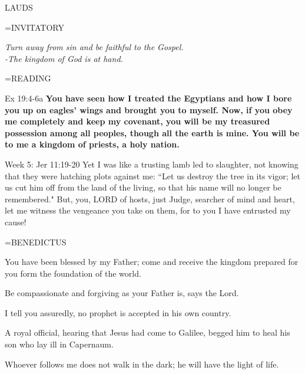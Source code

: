 \begin{flushleft}\normalsize LAUDS\\\end{flushleft}
\hangindent=\parindent \small{INVITATORY}
\begin{center}
\textit{Turn away from sin and be faithful to the Gospel.\\}
\textit{-The kingdom of God is at hand.\\}
\end{center}

\hangindent=\parindent \small READING
\begin{description}[labelindent=\parindent, leftmargin=*]
\item [Week 1-4:]   Ex 19:4-6a \textbf{  You have seen how I treated the Egyptians and how I bore you up on eagles’ wings and brought you to myself. Now, if you obey me completely and keep my covenant, you will be my treasured possession among all peoples, though all the earth is mine. You will be to me a kingdom of priests, a holy nation.}
\end{description}

Week 5:  Jer 11:19-20  Yet I was like a trusting lamb led to slaughter, not knowing that they were hatching plots against me: “Let us destroy the tree in its vigor; let us cut him off from the land of the living, so that his name will no longer be remembered." But, you, LORD of hosts, just Judge, searcher of mind and heart, let me witness the vengeance you take on them, for to you I have entrusted my cause!

\hangindent=\parindent \small BENEDICTUS
\begin{description}[labelindent=\parindent, noitemsep, leftmargin=*]
\item [Week 1:] 	You have been blessed by my Father; come and receive the kingdom prepared for you form the foundation of the world.
\item [Week 2:] 	Be compassionate and forgiving as your Father is, says the Lord.
\item [Week 3:] 	I tell you assuredly, no prophet is accepted in his own country.
\item [Week 4:] 	A royal official, hearing that Jesus had come to Galilee, begged him to heal his son who lay ill in Capernaum.
\item [Week 5:] 	Whoever follows me does not walk in the dark; he will have the light of life.
\end{description}

